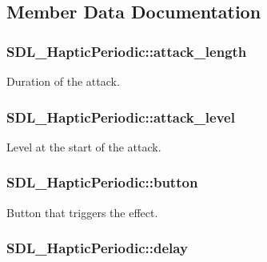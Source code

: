 \subsection{Member Data Documentation}
\hypertarget{struct_s_d_l___haptic_periodic_ab35eedce7107edc75640586159fe75bb}{
\subsubsection[{attack\-\_\-length}]{ S\-D\-L\-\_\-\-Haptic\-Periodic\-::attack\-\_\-length}}\label{struct_s_d_l___haptic_periodic_ab35eedce7107edc75640586159fe75bb}
Duration of the attack. \hypertarget{struct_s_d_l___haptic_periodic_a79fc2217fea6db6ab3d89ad905d52ccb}{
\subsubsection[{attack\-\_\-level}]{ S\-D\-L\-\_\-\-Haptic\-Periodic\-::attack\-\_\-level}}\label{struct_s_d_l___haptic_periodic_a79fc2217fea6db6ab3d89ad905d52ccb}
Level at the start of the attack. \hypertarget{struct_s_d_l___haptic_periodic_a9e0177354f4a285b8c98e4a31cd31752}{
\subsubsection[{button}]{ S\-D\-L\-\_\-\-Haptic\-Periodic\-::button}}\label{struct_s_d_l___haptic_periodic_a9e0177354f4a285b8c98e4a31cd31752}
Button that triggers the effect. \hypertarget{struct_s_d_l___haptic_periodic_a8688d1c7ee6270ed290f6b474aef5ec9}{
\subsubsection[{delay}]{ S\-D\-L\-\_\-\-Haptic\-Periodic\-::delay}}\label{struct_s_d_l___haptic_periodic_a8688d1c7ee6270ed290f6b474aef5ec9}
